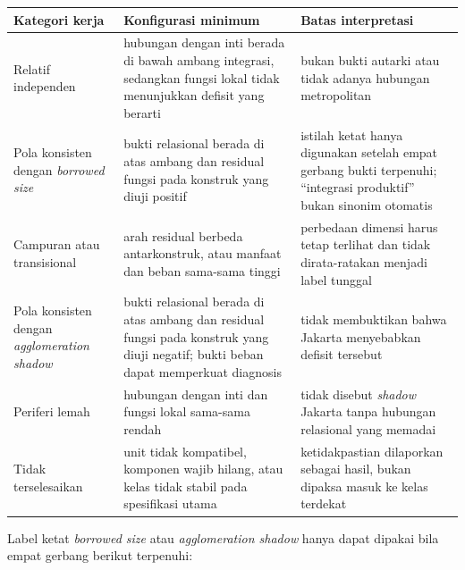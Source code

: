 \documentclass[
  indonesian,
  11pt,
  a4paper,
  oneside,
  openany]{report}
\newcounter{none} %
\begin{document}
{\def\LTcaptype{none} %
\begin{longtable}[]{@{}
  >{\raggedright\arraybackslash}p{}
  >{\raggedright\arraybackslash}p{}
  >{\raggedright\arraybackslash}p{}@{}}
\toprule\noalign{}
\begin{minipage}[b]{\linewidth}\raggedright
Kategori kerja
\end{minipage} & \begin{minipage}[b]{\linewidth}\raggedright
Konfigurasi minimum
\end{minipage} & \begin{minipage}[b]{\linewidth}\raggedright
Batas interpretasi
\end{minipage} \\
\midrule\noalign{}
\endhead
\bottomrule\noalign{}
\endlastfoot
Relatif independen & hubungan dengan inti berada di bawah ambang
integrasi, sedangkan fungsi lokal tidak menunjukkan defisit yang berarti
& bukan bukti autarki atau tidak adanya hubungan metropolitan \\
Pola konsisten dengan \emph{borrowed size} & bukti relasional berada di
atas ambang dan residual fungsi pada konstruk yang diuji positif &
istilah ketat hanya digunakan setelah empat gerbang bukti terpenuhi;
``integrasi produktif'' bukan sinonim otomatis \\
Campuran atau transisional & arah residual berbeda antarkonstruk, atau
manfaat dan beban sama-sama tinggi & perbedaan dimensi harus tetap
terlihat dan tidak dirata-ratakan menjadi label tunggal \\
Pola konsisten dengan \emph{agglomeration shadow} & bukti relasional
berada di atas ambang dan residual fungsi pada konstruk yang diuji
negatif; bukti beban dapat memperkuat diagnosis & tidak membuktikan
bahwa Jakarta menyebabkan defisit tersebut \\
Periferi lemah & hubungan dengan inti dan fungsi lokal sama-sama rendah
& tidak disebut \emph{shadow} Jakarta tanpa hubungan relasional yang
memadai \\
Tidak terselesaikan & unit tidak kompatibel, komponen wajib hilang, atau
kelas tidak stabil pada spesifikasi utama & ketidakpastian dilaporkan
sebagai hasil, bukan dipaksa masuk ke kelas terdekat \\
\end{longtable}
}

Label ketat \emph{borrowed size} atau \emph{agglomeration shadow} hanya
dapat dipakai bila empat gerbang berikut terpenuhi:
\end{document}
